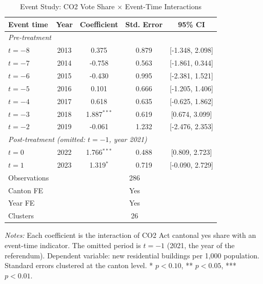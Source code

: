 \begin{table}[H]
\centering
\caption{Event Study: CO2 Vote Share $\times$ Event-Time Interactions}
\begin{threeparttable}
\begin{tabular}{lcccc}
\toprule
Event time & Year & Coefficient & Std. Error & 95\% CI \\
\midrule
\multicolumn{5}{l}{\textit{Pre-treatment}} \\
$t = -8$ & 2013 & 0.375 & 0.879 & [-1.348, 2.098] \\
$t = -7$ & 2014 & -0.758 & 0.563 & [-1.861, 0.344] \\
$t = -6$ & 2015 & -0.430 & 0.995 & [-2.381, 1.521] \\
$t = -5$ & 2016 & 0.101 & 0.666 & [-1.205, 1.406] \\
$t = -4$ & 2017 & 0.618 & 0.635 & [-0.625, 1.862] \\
$t = -3$ & 2018 & 1.887$^{***}$ & 0.619 & [0.674, 3.099] \\
$t = -2$ & 2019 & -0.061 & 1.232 & [-2.476, 2.353] \\
\midrule
\multicolumn{5}{l}{\textit{Post-treatment (omitted: $t=-1$, year 2021)}} \\
$t = 0$ & 2022 & 1.766$^{***}$ & 0.488 & [0.809, 2.723] \\
$t = 1$ & 2023 & 1.319$^{*}$ & 0.719 & [-0.090, 2.729] \\
\midrule
Observations & \multicolumn{4}{c}{286} \\
Canton FE & \multicolumn{4}{c}{Yes} \\
Year FE & \multicolumn{4}{c}{Yes} \\
Clusters & \multicolumn{4}{c}{26} \\
\bottomrule
\end{tabular}
\begin{tablenotes}[flushleft]
\small
\item \textit{Notes:} Each coefficient is the interaction of CO2 Act cantonal yes share with an event-time indicator. The omitted period is $t = -1$ (2021, the year of the referendum). Dependent variable: new residential buildings per 1,000 population. Standard errors clustered at the canton level. * $p<0.10$, ** $p<0.05$, *** $p<0.01$.
\end{tablenotes}
\end{threeparttable}
\label{tab:eventstudy}
\end{table}
